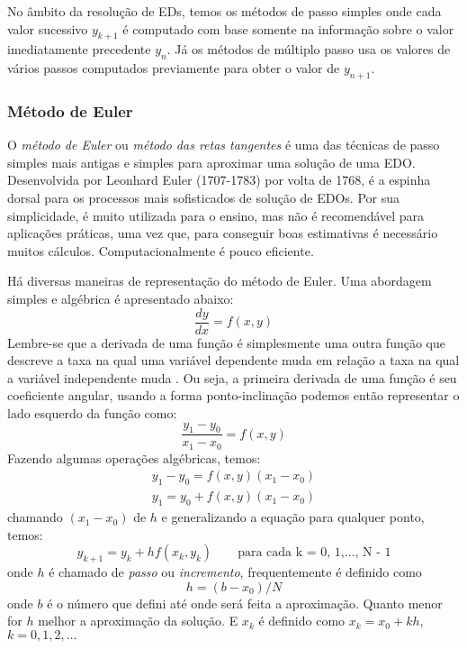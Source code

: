 No âmbito da resolução de EDs, temos os métodos de passo simples onde cada valor
sucessivo $y_{k+1}$ é computado com base somente na informação sobre o valor 
imediatamente precedente $y_{n}$. Já os métodos de múltiplo passo usa os valores
de vários passos computados previamente para obter o valor de $y_{n+1}$.

\subsubsection{Método de Euler}

O \emph{método de Euler} ou \emph{método das retas tangentes}
é uma das técnicas de passo simples  mais antigas e simples para aproximar uma solução 
de uma EDO. Desenvolvida por Leonhard Euler (1707-1783) por volta de 1768, é 
a espinha dorsal para os processos mais sofisticados de solução de EDOs.
Por sua simplicidade, é muito utilizada para o ensino, mas não é recomendável
para aplicações práticas, uma vez que, para conseguir boas estimativas é necessário
muitos cálculos. Computacionalmente é pouco eficiente.

Há diversas maneiras de representação do método de Euler. Uma abordagem simples
e algébrica é apresentado abaixo:
\begin{equation*}
\frac{dy}{dx} = f(x,y)
\end{equation*}
Lembre-se que a derivada de uma função é simplesmente uma outra
função que descreve a taxa na qual uma variável dependente muda em
relação a taxa na qual a variável independente muda \cite[tradução nossa]{thompson}.
Ou seja, a primeira derivada de uma função é seu coeficiente angular, usando a forma 
ponto-inclinação podemos então representar o lado esquerdo da função como:
\begin{equation*}
\frac{y_{1}-y_{0}}{x_{1}-x_{0}} = f(x,y)
\end{equation*}
Fazendo algumas operações algébricas, temos:
\begin{equation*}
\begin{split}
y_{1}-y_{0} = f(x,y)(x_{1}-x_{0})\\
y_{1} = y_{0} + f(x,y)(x_{1}-x_{0})
\end{split}
\end{equation*}
chamando $(x_{1}-x_{0})$ de $h$ e generalizando a equação para qualquer ponto, temos:
\begin{equation*}
y_{k+1} = y_{k} + hf(x_{k},y_{k})
\qquad \text{para cada k = 0, 1,$\dotsc$, N - 1}
\label{euler}
\end{equation*}
onde $h$ é chamado de \emph{passo} ou \emph{incremento}, frequentemente é definido como 
\begin{equation*}
h = (b-x_{0})/N
\end{equation*}
onde $b$ é o número que defini até onde será feita a aproximação. Quanto menor for $h$ melhor a 
aproximação da solução. E $x_{k}$ é definido como $x_{k} = x_{0}+kh$, $k = 0, 1, 2,\dotsc$

